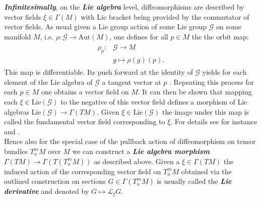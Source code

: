 \documentclass[a4paper,12pt, DIV=14, BCOR=5mm, twoside, headsepline]{scrbook}
\begin{document}
\textit{\textbf{Infinitesimally}}, on the \textbf{\textit{Lie algebra}} level, diffeomorphisms are described by vector fields $\xi \in \Gamma(M)$ with Lie bracket being provided by the commutator of vector fields. 
As usual given a Lie group action of some Lie group $\mathcal{G}$ on some manifold $M$, i.e. $\rho : \mathcal{G} \rightarrow \mathrm{Aut}(M)$, one defines for all $p \in M$ the the orbit map:
\begin{align}
    \begin{aligned}
    \rho_p : &\mathcal{G} \longrightarrow M \\
    &g \longmapsto \rho(g)(p).
    \end{aligned}
\end{align}
This map is differentiable. Its push forward at the identity of $\mathcal{G}$ yields for each element of the Lie algebra of $\mathcal{G}$ a tangent vector at $p$ . Repeating this process for each $p \in M$ one obtains a vector field on $M$. It can then be shown that mapping each $\xi \in \mathrm{Lie}(\mathcal{G})$ to the negative of this vector field defines a morphism of Lie algebras $\mathrm{Lie}(\mathcal{G}) \rightarrow \Gamma(TM)$. Given $\xi \in \mathrm{Lie}(\mathcal{G})$ the image under this map is called the fundamental vector field corresponding to $\xi$. For details see for instance \cite{boothby1989} and \cite{doi:10.1142/3867}.\\

Hence also for the special case of the pullback action of diffeomorphism on tensor bundles $T^m_nM$ over $M$ we can construct a \textit{\textbf{Lie algebra morphism}} $\Gamma(TM) \rightarrow \Gamma(T(T^m_nM))$ as described above. Given a $\xi \in \Gamma(TM)$ the induced action of the corresponding vector field on $T^m_nM$ obtained via the outlined construction on sections $G \in \Gamma(T^m_nM)$ is usually called the \textit{\textbf{Lie derivative}} and denoted by $G \mapsto \mathcal{L}_{\xi}G$. \\
\end{document}
